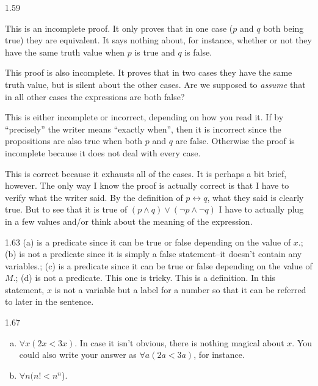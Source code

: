 \begin{Answer}{1.59}
\begin{pfevalenum}
\item
This is an incomplete proof.  It only proves that in one case ($p$ and $q$ both being true) they are
equivalent.  It says nothing about, for instance, whether or not they have the same truth value
when $p$ is true and $q$ is false.
\item
This proof is also incomplete.  It proves that in two cases they have the same truth value, but is silent
about the other cases.  Are we supposed to {\em assume} that in all other cases the expressions are both false?
\item
This is either incomplete or incorrect, depending on how you read it.
If by ``precisely'' the writer means ``exactly when'', then it is incorrect since the propositions are
also true when both $p$ and $q$ are false.  Otherwise the proof is incomplete because it does not deal
with every case.
\item
This is correct because it exhausts all of the cases.  It is perhaps a bit brief, however.
The only way I know the proof is actually correct is that I have to verify what the writer said.
By the definition of $p\leftrightarrow q$, what they said is clearly true.  But to see that it is true of
$(p\wedge q)\vee(\neg p\wedge \neg q)$ I have to actually plug in a few values and/or think about the
meaning of the expression.
\end{pfevalenum}
\end{Answer}
\begin{Answer}{1.63}
(a) is a predicate since it can be true or false depending on the value of $x$.;
(b) is not a predicate since it is simply a false statement--it doesn't contain any variables.;
(c) is a predicate since it can be true or false depending on the value of $M$.;
(d) is not a predicate.  This one is tricky.  This is a definition.
In this statement, $x$ is not a variable but a label for a number so that it can be referred to later in the sentence.
\end{Answer}
\begin{Answer}{1.67}
\begin{enumerate}[(a)]
\item $\forall x (2x<3x)$.  In case it isn't obvious, there is nothing magical about $x$.
You could also write your answer as $\forall a (2a<3a)$, for instance.
\item $\forall n (n!<n^n$).
\end{enumerate}
\end{Answer}
